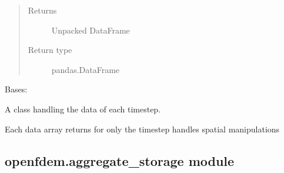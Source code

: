 \documentclass[letterpaper,10pt,english]{sphinxmanual}
\begin{document}
\begin{fulllineitems}
\begin{fulllineitems}
\begin{quote}
\begin{description}
\item[{Returns}] \leavevmode
Unpacked DataFrame

\item[{Return type}] \leavevmode
pandas.DataFrame

\end{description}\end{quote}

\end{fulllineitems}


\end{fulllineitems}


\begin{fulllineitems}
\label{\detokenize{openfdem:openfdem.openfdem.Timestep}}
Bases: 

A class handling the data of each timestep.

Each data array returns for only the timestep
handles spatial manipulations

\end{fulllineitems}



\subsection{openfdem.aggregate\_storage module}
\label{\detokenize{openfdem:module-openfdem.aggregate_storage}}\label{\detokenize{openfdem:openfdem-aggregate-storage-module}}
\end{document}
